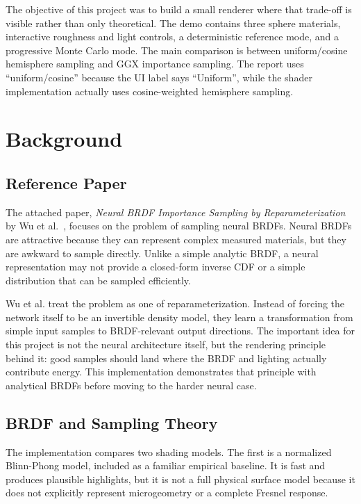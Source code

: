 \documentclass[12pt]{article}
\begin{document}
The objective of this project was to build a small renderer where that trade-off is visible rather than only theoretical. The demo contains three sphere materials, interactive roughness and light controls, a deterministic reference mode, and a progressive Monte Carlo mode. The main comparison is between uniform/cosine hemisphere sampling and GGX importance sampling. The report uses ``uniform/cosine'' because the UI label says ``Uniform'', while the shader implementation actually uses cosine-weighted hemisphere sampling.

\section{Background}

\subsection{Reference Paper}

The attached paper, \emph{Neural BRDF Importance Sampling by Reparameterization} by Wu et al.~\cite{wu2025neural}, focuses on the problem of sampling neural BRDFs. Neural BRDFs are attractive because they can represent complex measured materials, but they are awkward to sample directly. Unlike a simple analytic BRDF, a neural representation may not provide a closed-form inverse CDF or a simple distribution that can be sampled efficiently.

Wu et al. treat the problem as one of reparameterization. Instead of forcing the network itself to be an invertible density model, they learn a transformation from simple input samples to BRDF-relevant output directions. The important idea for this project is not the neural architecture itself, but the rendering principle behind it: good samples should land where the BRDF and lighting actually contribute energy. This implementation demonstrates that principle with analytical BRDFs before moving to the harder neural case.

\subsection{BRDF and Sampling Theory}

The implementation compares two shading models. The first is a normalized Blinn-Phong model, included as a familiar empirical baseline. It is fast and produces plausible highlights, but it is not a full physical surface model because it does not explicitly represent microgeometry or a complete Fresnel response.
\end{document}
